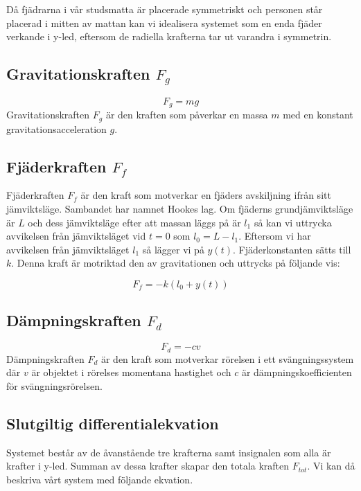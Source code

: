 \documentclass[10pt,a4paper]{article}
\begin{document}
Då fjädrarna i vår studsmatta är placerade symmetriskt och personen står placerad i mitten av mattan kan vi idealisera systemet som en enda fjäder verkande i y-led, eftersom de radiella krafterna tar ut varandra i symmetrin.

\subsection{Gravitationskraften $F_g$}

\begin{equation}
F_g = m  g
\end{equation}
Gravitationskraften $F_g$ är den kraften som påverkar en massa $m$ med en konstant gravitationsacceleration $g$.

\subsection{Fjäderkraften $F_f$}

Fjäderkraften $F_f$ är den kraft som motverkar en fjäders avskiljning ifrån sitt jämviktsläge. Sambandet har namnet Hookes lag. Om fjäderns grundjämviktsläge är $L$ och dess jämviktsläge efter att massan läggs på är $l_1$ så kan vi uttrycka avvikelsen från jämviktsläget vid $t=0$ som $l_0 = L - l_1$. Eftersom vi har avvikelsen från jämviktsläget $l_1$ så lägger vi på $y(t)$. Fjäderkonstanten sätts till $k$. Denna kraft är motriktad den av gravitationen och uttrycks på följande vis:

\begin{equation}
F_f = -k (l_0 + y(t))
\end{equation}

\subsection{Dämpningskraften $F_d$}
\begin{equation}
F_d = -c  v
\end{equation}
Dämpningskraften $F_d$ är den kraft som motverkar rörelsen i ett svängningssystem där $v$ är objektet i rörelses momentana hastighet och $c$ är dämpningskoefficienten för svängningsrörelsen. 

\subsection{Slutgiltig differentialekvation}

Systemet består av de åvanstående tre krafterna samt insignalen som alla är krafter i y-led. Summan av dessa krafter skapar den totala kraften $F_{tot}$. Vi kan då beskriva vårt system med följande ekvation.
\end{document}
